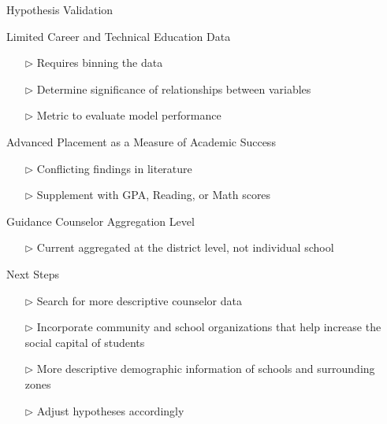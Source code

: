 \documentclass[10pt]{beamer}
\begin{document}
\begin{frame}{Hypothesis Validation}

    \begin{block}{Limited Career and Technical Education Data}
        \begin{itemize}
            \item[$\triangleright$] Requires binning the data
            \item[$\triangleright$] Determine significance of relationships between variables
            \item[$\triangleright$] Metric to evaluate model performance
        \end{itemize}
    \end{block}

    \vspace{1em}


    \begin{block}{Advanced Placement as a Measure of Academic Success}
        \begin{itemize}
            \item[$\triangleright$] Conflicting findings in literature 
            \item[$\triangleright$] Supplement with GPA, Reading, or Math scores
        \end{itemize}
    \end{block}
    
    \vspace{1em}

    \begin{block}{Guidance Counselor Aggregation Level}
        \begin{itemize}
            \item[$\triangleright$] Current aggregated at the district level, not individual school
        \end{itemize}
    \end{block}

\end{frame}

\begin{frame}{Next Steps}
    \fontsize{12pt}{10}
    \begin{itemize}
        \setlength\itemsep{2em}
        \item[$\triangleright$] Search for more descriptive counselor data
        \item[$\triangleright$] Incorporate community and school organizations that help increase the social capital of students
        \item[$\triangleright$] More descriptive demographic information of schools and surrounding zones
        \item[$\triangleright$] Adjust hypotheses accordingly  
    \end{itemize}
    

\end{frame}
\end{document}
